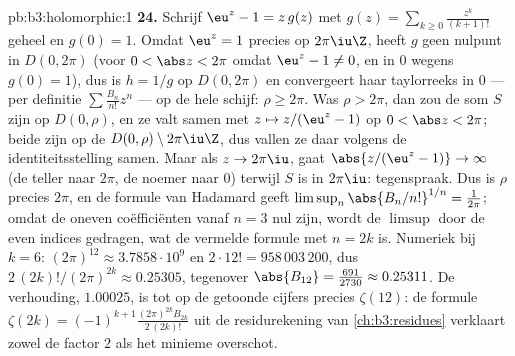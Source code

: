 \begin{solution}{pb:b3:holomorphic:1}
\textbf{24.} Schrijf $\eu^z - 1 = z\,g(z)$ met $g(z) =
\sum_{k\geq0}\frac{z^k}{(k+1)!}$ geheel en $g(0) = 1$. Omdat
$\eu^z = 1$ precies op $2\pi\iu\Z$, heeft $g$ geen nulpunt in
$D(0, 2\pi)$ (voor $0 < \abs z < 2\pi$ omdat $\eu^z - 1 \neq 0$,
en in $0$ wegens $g(0) = 1$), dus is $h = 1/g$  op
$D(0,2\pi)$ en convergeert haar taylorreeks in $0$ --- per
definitie $\sum\frac{B_n}{n!}z^n$ --- op de hele schijf: $\rho
\geq 2\pi$. Was $\rho > 2\pi$, dan zou de som $S$  zijn
op $D(0,\rho)$, en ze valt samen met $z \mapsto z/(\eu^z - 1)$ op
$0 < \abs z < 2\pi$; beide zijn  op de   $D(0,\rho) \setminus 2\pi\iu\Z$, dus vallen ze daar
volgens de identiteitsstelling samen. Maar als $z \to 2\pi\iu$,
gaat $\abs{z/(\eu^z - 1)} \to \infty$ (de teller naar $2\pi$, de
noemer naar $0$) terwijl $S$  is in $2\pi\iu$:
tegenspraak. Dus is $\rho$ precies $2\pi$, en de formule van
Hadamard geeft $\limsup_n\abs{B_n/n!}^{1/n} = \frac1{2\pi}$;
omdat de oneven coëfficiënten vanaf $n = 3$ nul zijn, wordt de
$\limsup$ door de even indices gedragen, wat de vermelde formule
met $n = 2k$ is. Numeriek bij $k = 6$: $(2\pi)^{12} \approx
3.7858\cdot10^9$ en $2\cdot12! = 958\,003\,200$, dus $2\,(2k)!/
(2\pi)^{2k} \approx 0.25305$, tegenover $\abs{B_{12}} =
\frac{691}{2730} \approx 0.25311$. De verhouding, $1.00025$, is
tot op de getoonde cijfers precies $\zeta(12)$: de formule
$\zeta(2k) = (-1)^{k+1}\frac{(2\pi)^{2k}B_{2k}}{2\,(2k)!}$ uit de
residurekening van \cref{ch:b3:residues} verklaart zowel de
factor $2$ als het minieme overschot.


\end{solution}
